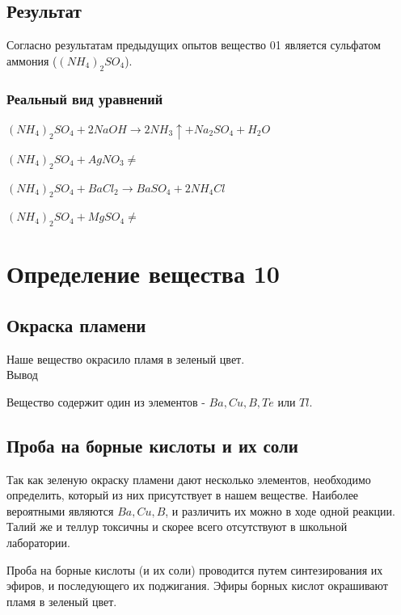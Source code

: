 \documentclass[a4paper,14pt,titlepage,twoside]{article}
\begin{document}
        \subsection{Результат}
            Согласно результатам предыдущих опытов вещество 01 является сульфатом
            аммония ($(NH_4)_2SO_4$).

            \subsubsection{Реальный вид уравнений}
                $(NH_4)_2SO_4+2NaOH \to 2NH_3\uparrow + Na_2SO_4 + H_2O$
                \par$(NH_4)_2SO_4+AgNO_3 \ne$
                \par$(NH_4)_2SO_4+BaCl_2\to BaSO_4 + 2NH_4Cl$
                \par$(NH_4)_2SO_4+MgSO_4\ne$
            

    \newpage
    \section{Определение вещества 10}
        
        \subsection{Окраска пламени} 
            Наше вещество окрасило пламя в зеленый цвет.\\

            Вывод

            Вещество содержит один из элементов - $Ba, Cu, B, Te$ или $Tl$.

        \subsection{Проба на борные кислоты и их соли}
            Так как зеленую окраску пламени дают несколько элементов, необходимо определить,
            который из них присутствует в нашем веществе. Наиболее вероятными являются
            $Ba, Cu, B$, и различить их можно в ходе одной реакции. Талий же и теллур токсичны
            и скорее всего отсутствуют в школьной лаборатории.\newline

            Проба на борные кислоты (и их соли) проводится путем синтезирования их эфиров,
            и последующего их поджигания. Эфиры борных кислот окрашивают 
            пламя в зеленый цвет.\\
\end{document}
